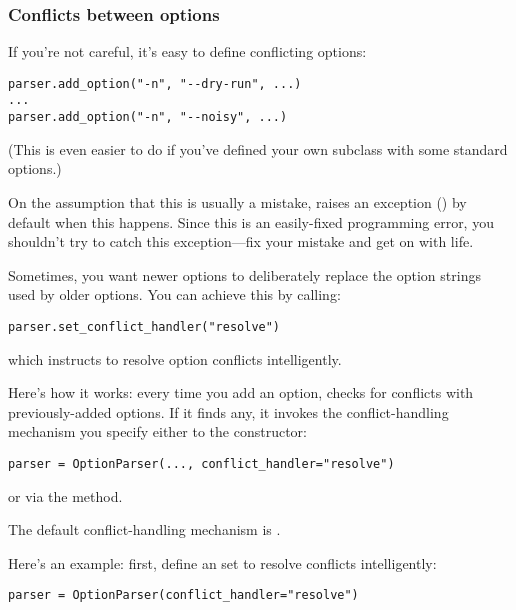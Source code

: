\subsubsection{Conflicts between options\label{optparse-conflicts}}

If you're not careful, it's easy to define conflicting options:

\begin{verbatim}
parser.add_option("-n", "--dry-run", ...)
...
parser.add_option("-n", "--noisy", ...)
\end{verbatim} 

(This is even easier to do if you've defined your own
 subclass with some standard options.)

On the assumption that this is usually a mistake, 
raises an exception () by default when
this happens.  Since this is an easily-fixed programming error, you
shouldn't try to catch this exception---fix your mistake and get on
with life.

Sometimes, you want newer options to deliberately replace the option
strings used by older options.  You can achieve this by calling:

\begin{verbatim}
parser.set_conflict_handler("resolve")
\end{verbatim}

which instructs  to resolve option conflicts
intelligently.

Here's how it works: every time you add an option, 
checks for conflicts with previously-added options.  If it finds any,
it invokes the conflict-handling mechanism you specify either to the
 constructor:

\begin{verbatim}
parser = OptionParser(..., conflict_handler="resolve")
\end{verbatim}

or via the  method.

The default conflict-handling mechanism is .

Here's an example: first, define an  set to
resolve conflicts intelligently:

\begin{verbatim}
parser = OptionParser(conflict_handler="resolve")
\end{verbatim}


